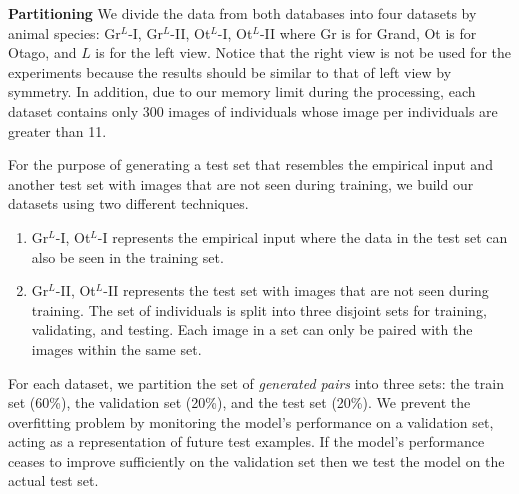 \textbf{Partitioning}
We divide the data from both databases into four datasets by animal species:
Gr$^{L}$-I, Gr$^{L}$-II, Ot$^{L}$-I, Ot$^{L}$-II where Gr is for Grand, Ot is
for Otago, and $L$ is for the left view. Notice that the right view is not be used for the
experiments because the results should be similar to that of left view by
symmetry. In addition, due to our memory limit during the processing, each
dataset contains only 300 images of individuals whose image per individuals are
greater than 11.

For the purpose of generating a test set that resembles the empirical input and
another test set with images that are not seen during training, we build
our datasets using two different techniques.
\begin{enumerate}
  \item Gr$^{L}$-I, Ot$^{L}$-I represents the empirical input where the data in
  the test set can also be seen in the training set.
  \item Gr$^{L}$-II, Ot$^{L}$-II represents the test set with images that are
  not seen during training. The set of individuals is split into three
  disjoint sets for training, validating, and testing. Each image in a set can
  only be paired with the images within the same set.
\end{enumerate}

For each dataset, we partition the set of \emph{generated pairs} into three
sets: the train set (60\%), the validation set (20\%), and the test set (20\%).
We prevent the overfitting problem by monitoring the model's performance on a
validation set, acting as a representation of future test examples. If the
model's performance ceases to improve sufficiently on the validation set then
we test the model on the actual test set.

